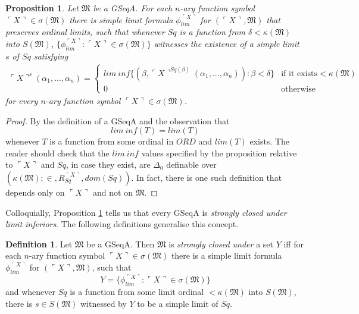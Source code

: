 \documentclass[12pt, twoside]{memoir}
\numberwithin{equation}{section}
\newtheorem{prop}[thm]{Proposition}
\theoremstyle{definition}
\newtheorem{defi}[thm]{Definition}
\theoremstyle{remark}
\theoremstyle{definition}
\theoremstyle{definition}
\theoremstyle{definition}
\theoremstyle{remark}
\begin{document}
\begin{prop}\label{prop233}
Let $\mathfrak{M}$ be a GSeqA. For each $n$-ary function symbol $\ulcorner X \urcorner \in \sigma(\mathfrak{M})$ there is simple limit formula $\phi_{lim}^{\ulcorner X \urcorner}$ for $(\ulcorner X \urcorner, \mathfrak{M})$ that preserves ordinal limits, such that whenever $Sq$ is a function from $\delta < \kappa(\mathfrak{M})$ into $S(\mathfrak{M})$, $\{\phi_{lim}^{\ulcorner X \urcorner} : \ulcorner X \urcorner \in \sigma(\mathfrak{M})\}$ witnesses the existence of a simple limit $s$ of $Sq$ satisfying 
\begin{gather*}
    \ulcorner X \urcorner^{s} (\alpha_1, ..., \alpha_n) = 
    \begin{cases}
        lim \ inf \{(\beta, \ulcorner X \urcorner^{Sq(\beta)}(\alpha_1, ..., \alpha_n)) : \beta < \delta\} & \!\!\!\! \text{if it exists} < \kappa(\mathfrak{M}) \\
        0 & \!\!\!\! \text{otherwise}
    \end{cases} 
\end{gather*}
for every $n$-ary function symbol $\ulcorner X \urcorner \in \sigma(\mathfrak{M})$.
\end{prop}

\begin{proof}
By the definition of a GSeqA and the observation that 
\begin{equation*}
    lim \ inf (T) = lim (T)
\end{equation*}
whenever $T$ is a function from some ordinal in $ORD$ and $lim (T)$ exists. The reader should check that the $lim \ inf$ values specified by the proposition relative to $\ulcorner X \urcorner$ and $Sq$, in case they exist, are $\Delta_0$ definable over $(\kappa(\mathfrak{M}); \in, R_{Sq}^{\ulcorner X \urcorner}, dom(Sq))$. In fact, there is one such definition that depends only on $\ulcorner X \urcorner$ and not on $\mathfrak{M}$.
\end{proof}

Colloquially, Proposition \ref{prop233} tells us that every GSeqA is \emph{strongly closed under limit inferiors}. The following definitions generalise this concept.

\begin{defi}\label{def237}
Let $\mathfrak{M}$ be a GSeqA. Then $\mathfrak{M}$ is \emph{strongly closed under} a set $Y$ iff for each $n$-ary function symbol $\ulcorner X \urcorner \in \sigma(\mathfrak{M})$ there is a simple limit formula $\phi_{lim}^{\ulcorner X \urcorner}$ for $(\ulcorner X \urcorner, \mathfrak{M})$, such that 
\begin{equation*}
    Y = \{\phi_{lim}^{\ulcorner X \urcorner} : \ulcorner X \urcorner \in \sigma(\mathfrak{M})\}
\end{equation*}
and whenever $Sq$ is a function from some limit ordinal $< \kappa(\mathfrak{M})$ into $S(\mathfrak{M})$, there is $s \in S(\mathfrak{M})$ witnessed by $Y$ to be a simple limit of $Sq$.
\end{defi}
\end{document}
